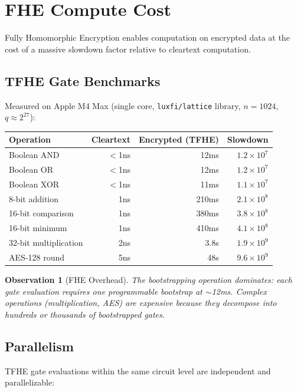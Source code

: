 \documentclass[11pt,a4paper]{article}
\newtheorem{observation}{Observation}[section]
\begin{document}
\section{FHE Compute Cost}

Fully Homomorphic Encryption enables computation on encrypted data at the cost of a massive slowdown factor relative to cleartext computation.

\subsection{TFHE Gate Benchmarks}

Measured on Apple M4 Max (single core, \texttt{luxfi/lattice} library, $n=1024$, $q \approx 2^{27}$):

\begin{center}
\begin{tabular}{lrrr}
\toprule
\textbf{Operation} & \textbf{Cleartext} & \textbf{Encrypted (TFHE)} & \textbf{Slowdown} \\
\midrule
Boolean AND & $<$1ns & 12ms & $1.2 \times 10^7$ \\
Boolean OR & $<$1ns & 12ms & $1.2 \times 10^7$ \\
Boolean XOR & $<$1ns & 11ms & $1.1 \times 10^7$ \\
8-bit addition & 1ns & 210ms & $2.1 \times 10^8$ \\
16-bit comparison & 1ns & 380ms & $3.8 \times 10^8$ \\
16-bit minimum & 1ns & 410ms & $4.1 \times 10^8$ \\
32-bit multiplication & 2ns & 3.8s & $1.9 \times 10^9$ \\
AES-128 round & 5ns & 48s & $9.6 \times 10^9$ \\
\bottomrule
\end{tabular}
\end{center}

\begin{observation}[FHE Overhead]
The bootstrapping operation dominates: each gate evaluation requires one programmable bootstrap at $\sim$12ms. Complex operations (multiplication, AES) are expensive because they decompose into hundreds or thousands of bootstrapped gates.
\end{observation}

\subsection{Parallelism}

TFHE gate evaluations within the same circuit level are independent and parallelizable:
\end{document}
